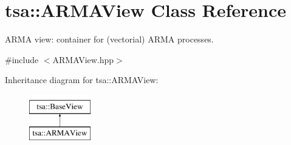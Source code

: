 \hypertarget{classtsa_1_1_a_r_m_a_view}{}\section{tsa\+:\+:A\+R\+M\+A\+View Class Reference}
\label{classtsa_1_1_a_r_m_a_view}


A\+R\+MA view\+: container for (vectorial) A\+R\+MA processes.  




{\ttfamily \#include $<$A\+R\+M\+A\+View.\+hpp$>$}

Inheritance diagram for tsa\+:\+:A\+R\+M\+A\+View\+:\begin{figure}[H]
\begin{center}
\leavevmode
\includegraphics[height=2.000000cm]{classtsa_1_1_a_r_m_a_view}
\end{center}
\end{figure}
